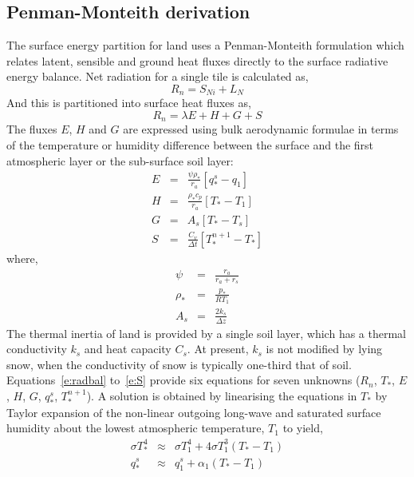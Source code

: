 \documentclass[a4paper]{article}
\begin{document}
\subsection{Penman-Monteith derivation}\label{s:surf.penmon}
The surface energy partition for land uses a Penman-Monteith
formulation which relates latent, sensible and ground heat fluxes
directly to the surface radiative energy balance.  Net radiation for a
single tile is calculated as,
\begin{equation}
  R_n = S_{Ni} + L_N \label{e:radbal}
\end{equation}
And this is partitioned into surface heat fluxes as,
\begin{equation}
  R_n = \lambda E + H + G + S \label{e:enbal}
\end{equation}
The fluxes $E$, $H$ and $G$ are expressed using bulk aerodynamic
formulae in terms of the temperature or humidity difference between
the surface and the first atmospheric layer or the sub-surface soil
layer:
\begin{eqnarray}
  E &=& \frac{\psi \rho_*}{r_a} \left[ q_*^s - q_1 \right]
  \label{e:E}\\
  H &=& \frac{\rho_* c_p}{r_a} \left[ T_* - T_1 \right] \label{e:H} \\
  G &=& A_s \left[ T_* - T_s \right] \label{e:G} \\
  S &=& \frac{C_v}{\Delta t} \left[ T_*^{n+1} - T_* \right] \label{e:S}
\end{eqnarray}
where,
\begin{eqnarray}
  \psi &=& \frac{r_a}{r_a+r_s} \label{e:psi}\\
  \rho_* &=& \frac{p_*}{R T_1} \label{e:rho}\\
  A_s &=& \frac{2 k_s}{\Delta z} \label{e:as}
\end{eqnarray}
The thermal inertia of land is provided by a single soil layer, which
has a thermal conductivity $k_s$ and heat capacity $C_s$.  At present,
$k_s$ is not modified by lying snow, when the conductivity of snow is
typically one-third that of soil.  Equations~\eqref{e:radbal}
to~\eqref{e:S} provide six equations for seven unknowns ($R_n$, $T_*$,
$E$, $H$, $G$, $q_*^s$, $T_*^{n+1}$).  A solution is obtained by
linearising the equations in $T_*$ by Taylor expansion of the
non-linear outgoing long-wave and saturated surface humidity about the
lowest atmospheric temperature, $T_1$ to yield,
\begin{eqnarray}
  \sigma T_*^4 &\approx& \sigma T_1^4 + 4\sigma T_1^3(T_*-T_1)
  \label{e:LWlin} \\
  q_*^s &\approx& q_1^s + \alpha_1 \left( T_*-T_1 \right)
  \label{e:QSlin} 
\end{eqnarray}
\end{document}
